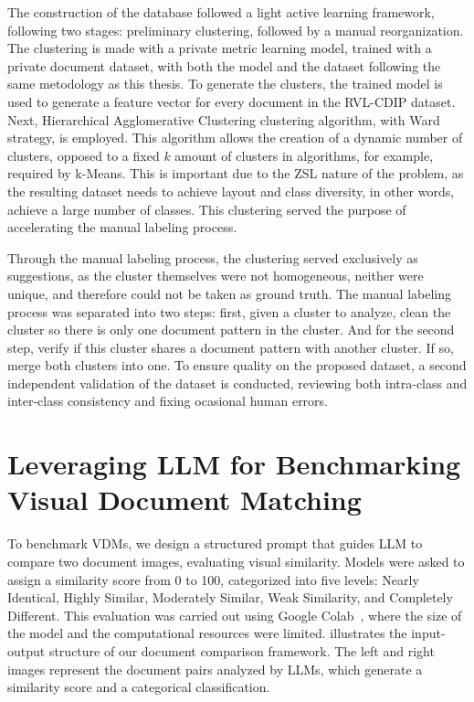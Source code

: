 The construction of the database followed a light active learning framework, following two stages: preliminary clustering, followed by a manual reorganization. The clustering is made with a private metric learning model, trained with a private document dataset, with both the model and the dataset following the same metodology as this thesis. To generate the clusters, the trained model is used to generate a feature vector for every document in the \gls{RVL-CDIP} dataset. Next, Hierarchical Agglomerative Clustering clustering algorithm, with Ward\cite{ward1963} strategy, is employed. This algorithm allows the creation of a dynamic number of clusters, opposed to a fixed $k$ amount of clusters in algorithms, for example, required by k-Means. This is important due to the \gls{ZSL} nature of the problem, as the resulting dataset needs to achieve layout and class diversity, in other words, achieve a large number of classes. This clustering served the purpose of accelerating the manual labeling process.

Through the manual labeling process, the clustering served exclusively as suggestions, as the cluster themselves were not homogeneous, neither were unique, and therefore could not be taken as ground truth. The manual labeling process was separated into two steps: first, given a cluster to analyze, clean the cluster so there is only one document pattern in the cluster. And for the second step, verify if this cluster shares a document pattern with another cluster. If so, merge both clusters into one. To ensure quality on the proposed dataset, a second independent validation of the dataset is conducted, reviewing both intra-class and inter-class consistency and fixing ocasional human errors.

\section{Leveraging LLM for Benchmarking Visual Document Matching}
\label{sec:method_benchmark}

To benchmark \glspl{VDM}, we design a structured prompt that guides \gls{LLM} to compare two document images, evaluating visual similarity. Models were asked to assign a similarity score from 0 to 100, categorized into five levels: Nearly Identical, Highly Similar, Moderately Similar, Weak Similarity, and Completely Different. This evaluation was carried out using Google Colab~\cite{googlecolab}, where the size of the model and the computational resources were limited.  illustrates the input-output structure of our document comparison framework. The left and right images represent the document pairs analyzed by \glspl{LLM}, which generate a similarity score and a categorical classification.

